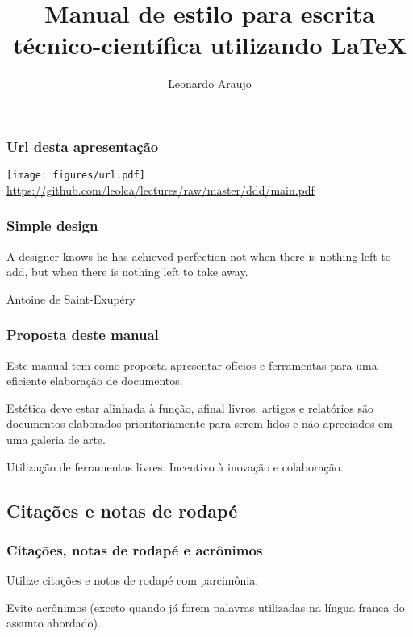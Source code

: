 \documentclass[10pt,notes,compress,aspectratio=169]{beamer}
\title[Manual de estilo]{Manual de estilo para escrita técnico-científica utilizando \LaTeX{}}
\author{Leonardo Araujo}
\institute{UFSJ}
\date{}
\begin{document}
\frame{\titlepage}

\begin{frame}
\frametitle{Url desta apresentação}
\centering
\texttt{[image: figures/url.pdf]}
\url{https://github.com/leolca/lectures/raw/master/ddd/main.pdf}
\end{frame}

\begin{frame}
\frametitle{Simple design}
\epigraph{A designer knows he has achieved perfection not when there is nothing left to add, but when there is nothing left to take away.}{Antoine de Saint-Exupéry}
\end{frame}


\begin{frame}
\frametitle{Proposta deste manual}
Este manual tem como proposta apresentar ofícios e ferramentas para uma eficiente elaboração
de documentos.
\pause

\vspace{3ex}
Estética deve estar alinhada à função, afinal livros, artigos e relatórios são documentos
elaborados prioritariamente para serem lidos e não apreciados em uma galeria de arte.
\pause

\vspace{3ex}
Utilização de ferramentas livres. Incentivo à inovação e colaboração.
\end{frame}











\subsection{Citações e notas de rodapé}
\begin{frame}
\frametitle{Citações, notas de rodapé e acrônimos}
Utilize citações e notas de rodapé com parcimônia.

\vspace{3ex}
Evite acrônimos (exceto quando já forem palavras utilizadas na língua franca do assunto abordado).
\end{frame}


\end{document}
